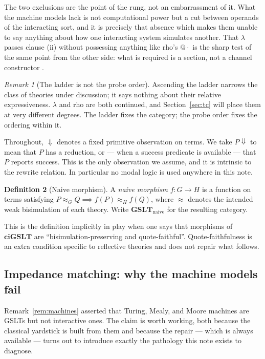 \documentclass[11pt,a4paper]{article}
\theoremstyle{definition}
\newtheorem{definition}{Definition}[section]
\theoremstyle{plain}
\theoremstyle{remark}
\newtheorem{remark}[definition]{Remark}
\newcommand{\GSLT}{\mathbf{GSLT}}
\newcommand{\ciGSLT}{\mathbf{ciGSLT}}
\newcommand{\bisim}{\approx}
\newcommand{\obs}{\Downarrow}
\begin{document}
The two exclusions are the point of the rung, not an embarrassment of it. What the
machine models lack is not computational power but a cut between operands of the
interacting sort, and it is precisely that absence which makes them unable to say
anything about how one interacting system simulates another. That $\lambda$ passes
clause (ii) without possessing anything like rho's $@\cdot$ is the sharp test of the
same point from the other side: what is required is a section, not a channel
constructor \cite[\S5.2]{cost}.

\begin{remark}[The ladder is not the probe order]
\label{rem:ladder-vs-order}
Ascending the ladder narrows the class of theories under discussion; it says nothing
about their relative expressiveness. $\lambda$ and rho are both continued, and
Section~\ref{sec:tc} will place them at very different degrees. The ladder fixes the
category; the probe order fixes the ordering within it.
\end{remark}

Throughout, $\obs$ denotes a fixed primitive observation on terms. We take
$P \obs$ to mean that $P$ has a reduction, or --- when a success predicate is
available --- that $P$ reports success. This is the only observation we assume, and
it is intrinsic to the rewrite relation. In particular no modal logic is used
anywhere in this note.

\begin{definition}[Naive morphism]
\label{def:naive}
A \emph{naive morphism} $f : G \to H$ is a function on terms satisfying
$P \bisim_G Q \implies f(P) \bisim_H f(Q)$, where $\bisim$ denotes the intended
weak bisimulation of each theory. Write $\GSLT_{\mathrm{naive}}$ for the resulting
category.
\end{definition}

This is the definition implicitly in play when one says that morphisms of $\ciGSLT$
are ``bisimulation-preserving and quote-faithful''. Quote-faithfulness is an extra
condition specific to reflective theories and does not repair what follows.

\subsection{Impedance matching: why the machine models fail}
\label{sec:impedance}

Remark~\ref{rem:machines} asserted that Turing, Mealy, and Moore machines are GSLTs
but not interactive ones. The claim is worth working, both because the classical
yardstick is built from them and because the repair --- which is always available ---
turns out to introduce exactly the pathology this note exists to diagnose.
\end{document}
